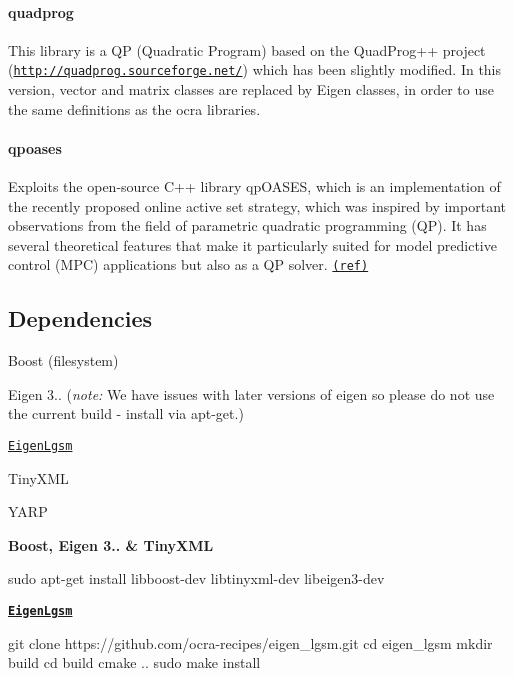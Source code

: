 \paragraph*{quadprog}

This library is a QP (Quadratic Program) based on the Quad\+Prog++ project (\href{http://quadprog.sourceforge.net/}{\tt http\+://quadprog.\+sourceforge.\+net/}) which has been slightly modified. In this version, vector and matrix classes are replaced by Eigen classes, in order to use the same definitions as the ocra libraries.

\paragraph*{qpoases}

Exploits the open-\/source C++ library qp\+O\+A\+S\+ES, which is an implementation of the recently proposed online active set strategy, which was inspired by important observations from the field of parametric quadratic programming (QP). It has several theoretical features that make it particularly suited for model predictive control (M\+PC) applications but also as a QP solver. \href{https://projects.coin-or.org/qpOASES}{\tt (ref)}

\subsection*{Dependencies}


\begin{DoxyItemize}
\item Boost ({\ttfamily filesystem})
\item Eigen 3.. ({\itshape note\+:} We have issues with later versions of eigen so please do not use the current build -\/ install via apt-\/get.)
\item \href{https://github.com/ocra-recipes/eigen_lgsm}{\tt Eigen\+Lgsm}
\item Tiny\+X\+ML
\item Y\+A\+RP
\end{DoxyItemize}

{\bfseries Boost, Eigen 3.. \& Tiny\+X\+ML} 
\begin{DoxyCode}
sudo apt-get install libboost-dev libtinyxml-dev libeigen3-dev
\end{DoxyCode}
 \href{https://github.com/ocra-recipes/eigen_lgsm}{\tt {\bfseries Eigen\+Lgsm}} 
\begin{DoxyCode}
git clone https://github.com/ocra-recipes/eigen\_lgsm.git
cd eigen\_lgsm
mkdir build
cd build
cmake ..
sudo make install
\end{DoxyCode}


